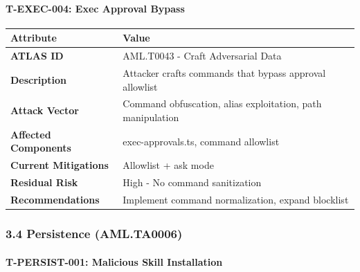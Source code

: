 \paragraph{T-EXEC-004: Exec Approval Bypass}



\begin{table}[h]
\centering
\small
\begin{tabular}{|l|l|}
\hline
Attribute & Value \\
\hline
\textbf{ATLAS ID} & AML.T0043 - Craft Adversarial Data \\
\hline
\textbf{Description} & Attacker crafts commands that bypass approval allowlist \\
\hline
\textbf{Attack Vector} & Command obfuscation, alias exploitation, path manipulation \\
\hline
\textbf{Affected Components} & exec-approvals.ts, command allowlist \\
\hline
\textbf{Current Mitigations} & Allowlist + ask mode \\
\hline
\textbf{Residual Risk} & High - No command sanitization \\
\hline
\textbf{Recommendations} & Implement command normalization, expand blocklist \\
\hline
\end{tabular}
\end{table}



\hrulefill


\subsubsection{3.4 Persistence (AML.TA0006)}


\paragraph{T-PERSIST-001: Malicious Skill Installation}



